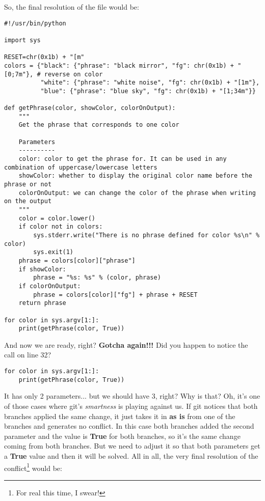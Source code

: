 So, the final resolution of the file would be:

\begin{lstlisting}[style=python_style,
	basicstyle=\small,
	caption={\bf example 16} - solved conflict]
#!/usr/bin/python

import sys

RESET=chr(0x1b) + "[m"
colors = {"black": {"phrase": "black mirror", "fg": chr(0x1b) + "[0;7m"}, # reverse on color
          "white": {"phrase": "white noise", "fg": chr(0x1b) + "[1m"},
          "blue": {"phrase": "blue sky", "fg": chr(0x1b) + "[1;34m"}}

def getPhrase(color, showColor, colorOnOutput):
    """
    Get the phrase that corresponds to one color
    
    Parameters
    ----------
    color: color to get the phrase for. It can be used in any combination of uppercase/lowercase letters
    showColor: whether to display the original color name before the phrase or not
    colorOnOutput: we can change the color of the phrase when writing on the output
    """
    color = color.lower()
    if color not in colors:
        sys.stderr.write("There is no phrase defined for color %s\n" % color)
        sys.exit(1)
    phrase = colors[color]["phrase"]
    if showColor:
        phrase = "%s: %s" % (color, phrase)
    if colorOnOutput:
        phrase = colors[color]["fg"] + phrase + RESET
    return phrase

for color in sys.argv[1:]:
    print(getPhrase(color, True))
\end{lstlisting}

And now we are ready, right? {\bf Gotcha again!!!} Did you happen to notice the call on line 32?

\begin{lstlisting}[style=python_style,
	firstnumber=31,
	basicstyle=\small,
	caption={\bf example 16} - call that needs to be adusted]
for color in sys.argv[1:]:
    print(getPhrase(color, True))
\end{lstlisting}

It has only 2 parameters... but we should have 3, right? Why is that? Oh, it's one of those cases where git's {\it smartness} is playing
against us. If git notices that both branches applied the same change, it just takes it in {\bf as is} from one of the branches and
generates no conflict. In this case both branches added the second parameter and the value is {\bf True} for both branches, so it's
the same change coming from both branches. But we need to adjust it so that both parameters get a {\bf True} value and then it will
be solved. All in all, the very final resolution of the conflict\footnote{For real this time, I swear!} would be:

